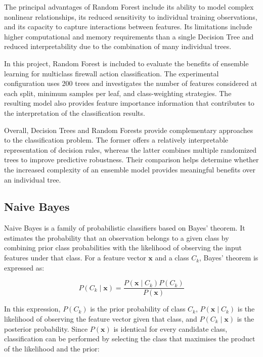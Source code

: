 The principal advantages of Random Forest include its ability to model complex nonlinear relationships, its reduced sensitivity to individual training observations, and its capacity to capture interactions between features. Its limitations include higher computational and memory requirements than a single Decision Tree and reduced interpretability due to the combination of many individual trees.

In this project, Random Forest is included to evaluate the benefits of ensemble learning for multiclass firewall action classification. The experimental configuration uses 200 trees and investigates the number of features considered at each split, minimum samples per leaf, and class-weighting strategies. The resulting model also provides feature importance information that contributes to the interpretation of the classification results.

Overall, Decision Trees and Random Forests provide complementary approaches to the classification problem. The former offers a relatively interpretable representation of decision rules, whereas the latter combines multiple randomized trees to improve predictive robustness. Their comparison helps determine whether the increased complexity of an ensemble model provides meaningful benefits over an individual tree.



\subsection{Naive Bayes}

Naive Bayes is a family of probabilistic classifiers based on Bayes' theorem. It estimates the probability that an observation belongs to a given class by combining prior class probabilities with the likelihood of observing the input features under that class. For a feature vector $\mathbf{x}$ and a class $C_k$, Bayes' theorem is expressed as:

\begin{equation}
P(C_k \mid \mathbf{x}) =
\frac{P(\mathbf{x} \mid C_k)P(C_k)}
{P(\mathbf{x})}
\label{eq:bayes}
\end{equation}

In this expression, $P(C_k)$ is the prior probability of class $C_k$, $P(\mathbf{x}\mid C_k)$ is the likelihood of observing the feature vector given that class, and $P(C_k\mid\mathbf{x})$ is the posterior probability. Since $P(\mathbf{x})$ is identical for every candidate class, classification can be performed by selecting the class that maximises the product of the likelihood and the prior:


